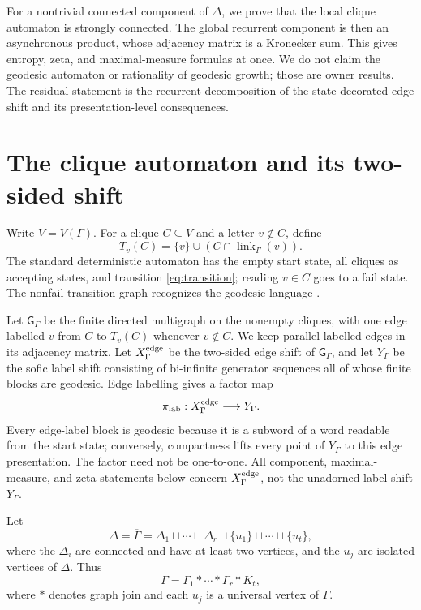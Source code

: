\documentclass[11pt,a4paper]{amsart}
\theoremstyle{definition}
\theoremstyle{remark}
\newcommand{\link}{\operatorname{link}}
\begin{document}
For a nontrivial connected component of $\Delta$, we prove that the local
clique automaton is strongly connected.  The global recurrent component is
then an asynchronous product, whose adjacency matrix is a Kronecker sum.
This gives entropy, zeta, and maximal-measure formulas at once.  We do not
claim the geodesic automaton or rationality of geodesic growth; those are
owner results.  The residual statement is the recurrent decomposition of the
state-decorated edge shift and its presentation-level consequences.

\section{The clique automaton and its two-sided shift}

Write $V=V(\Gamma)$.  For a clique $C\subseteq V$ and a letter $v\notin C$,
define
\begin{equation}\label{eq:transition}
 T_v(C)=\{v\}\cup(C\cap\link_\Gamma(v)).
\end{equation}
The standard deterministic automaton has the empty start state, all cliques
as accepting states, and transition \eqref{eq:transition}; reading
$v\in C$ goes to a fail state.  The nonfail transition graph recognizes the
geodesic language \cite{AntolinCiobanu2013}.

Let $\mathsf G_\Gamma$ be the finite directed multigraph on the nonempty
cliques, with one edge labelled $v$ from $C$ to $T_v(C)$ whenever $v\notin C$.
We keep parallel labelled edges in its adjacency matrix.  Let
$X_\Gamma^{\rm edge}$ be the two-sided edge shift of $\mathsf G_\Gamma$, and
let $Y_\Gamma$ be the sofic label shift consisting of bi-infinite generator
sequences all of whose finite blocks are geodesic.  Edge labelling gives a
factor map
\[
 \pi_{\rm lab}:X_\Gamma^{\rm edge}\longrightarrow Y_\Gamma.
\]
Every edge-label block is geodesic because it is a subword of a word readable
from the start state; conversely, compactness lifts every point of
$Y_\Gamma$ to this edge presentation.  The factor need not be one-to-one.
All component, maximal-measure, and zeta statements below concern
$X_\Gamma^{\rm edge}$, not the unadorned label shift $Y_\Gamma$.

Let
\[
 \Delta=\overline\Gamma=\Delta_1\sqcup\cdots\sqcup\Delta_r
 \sqcup\{u_1\}\sqcup\cdots\sqcup\{u_t\},
\]
where the $\Delta_i$ are connected and have at least two vertices, and the
$u_j$ are isolated vertices of $\Delta$.  Thus
\[
 \Gamma=\Gamma_1*\cdots*\Gamma_r*K_t,
\]
where $*$ denotes graph join and each $u_j$ is a universal vertex of
$\Gamma$.
\end{document}
